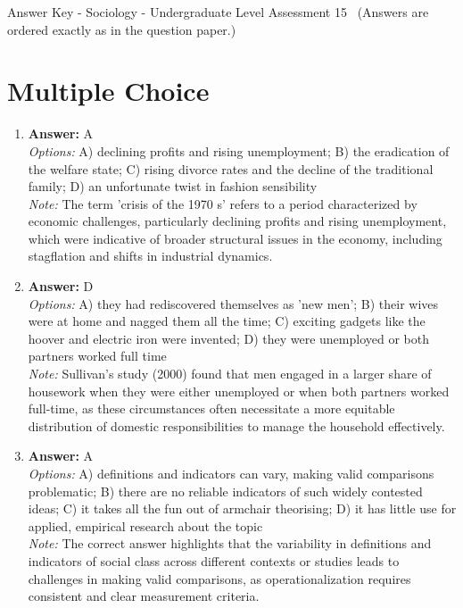 \documentclass[12pt]{article}
\begin{document}
\begin{center}
Answer Key - Sociology - Undergraduate Level Assessment 15 \
\small (Answers are ordered exactly as in the question paper.)
\end{center}

\section*{Multiple Choice}
\begin{enumerate}[label=\arabic*.]
\item \textbf{Answer:} A
\\ \textit{Options:} A) declining profits and rising unemployment; B) the eradication of the welfare state; C) rising divorce rates and the decline of the traditional family; D) an unfortunate twist in fashion sensibility
\\ \textit{Note:} The term 'crisis of the 1970 s' refers to a period characterized by economic challenges, particularly declining profits and rising unemployment, which were indicative of broader structural issues in the economy, including stagflation and shifts in industrial dynamics.
\item \textbf{Answer:} D
\\ \textit{Options:} A) they had rediscovered themselves as 'new men'; B) their wives were at home and nagged them all the time; C) exciting gadgets like the hoover and electric iron were invented; D) they were unemployed or both partners worked full time
\\ \textit{Note:} Sullivan's study (2000) found that men engaged in a larger share of housework when they were either unemployed or when both partners worked full-time, as these circumstances often necessitate a more equitable distribution of domestic responsibilities to manage the household effectively.
\item \textbf{Answer:} A
\\ \textit{Options:} A) definitions and indicators can vary, making valid comparisons problematic; B) there are no reliable indicators of such widely contested ideas; C) it takes all the fun out of armchair theorising; D) it has little use for applied, empirical research about the topic
\\ \textit{Note:} The correct answer highlights that the variability in definitions and indicators of social class across different contexts or studies leads to challenges in making valid comparisons, as operationalization requires consistent and clear measurement criteria.

\end{enumerate}
\end{document}
